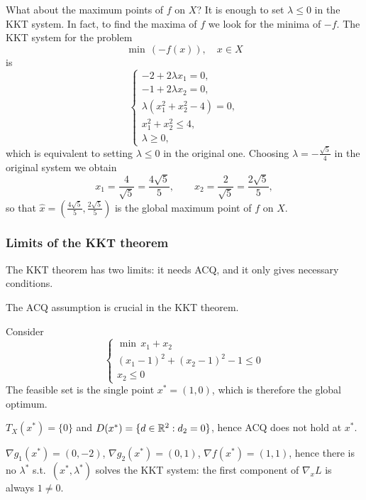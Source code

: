 What about the maximum points of $f$ on $X$? It is enough to set $\lambda \le 0$ in the KKT system. In fact, to find the maxima of $f$ we look for the minima of $-f$. The KKT system for the problem
\[
    \min\, (-f(x)), \quad x \in X
\]
is
\[
    \begin{cases}
        -2 + 2\lambda x_1 = 0,\\
        -1 + 2\lambda x_2 = 0,\\
        \lambda(x_1^2 + x_2^2 - 4) = 0,\\
        x_1^2 + x_2^2 \le 4,\\
        \lambda \ge 0,
    \end{cases}
\]
which is equivalent to setting $\lambda \le 0$ in the original one. Choosing $\lambda = -\frac{\sqrt{5}}{4}$ in the original system we obtain
\[
    x_1 = \frac{4}{\sqrt{5}} = \frac{4\sqrt{5}}{5}, \qquad x_2 = \frac{2}{\sqrt{5}} = \frac{2\sqrt{5}}{5},
\]
so that $\hat{x} = \left(\frac{4\sqrt{5}}{5}, \frac{2\sqrt{5}}{5}\right)$ is the global maximum point of $f$ on $X$.

\subsubsection{Limits of the KKT theorem}

The KKT theorem has two limits: it needs ACQ, and it only gives necessary conditions.

\begin{remark}
    The ACQ assumption is crucial in the KKT theorem.
\end{remark}

\begin{example}
    Consider
    \[
        \begin{cases}
            \min\, x_1 + x_2\\
            (x_1 - 1)^2 + (x_2 - 1)^2 - 1 \le 0\\
            x_2 \le 0
        \end{cases}
    \]
    The feasible set is the single point $x^* = (1, 0)$, which is therefore the global optimum.

    $T_X(x^*) = \{0\}$ and $D(x^*) = \{d \in \mathbb{R}^2 : d_2 = 0\}$, hence ACQ does not hold at $x^*$.

    $\nabla g_1(x^*) = (0, -2)$, $\nabla g_2(x^*) = (0, 1)$, $\nabla f(x^*) = (1, 1)$, hence there is no $\lambda^*$ s.t.\ $(x^*, \lambda^*)$ solves the KKT system: the first component of $\nabla_x L$ is always $1 \neq 0$.
\end{example}

